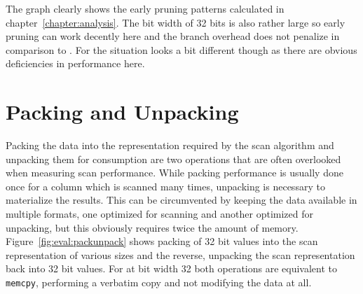 The graph clearly shows the early pruning patterns calculated in
chapter~\ref{chapter:analysis}. The bit width of 32 bits is also rather large so
early pruning can work decently here and the branch overhead does not penalize
\bwv{} in comparison to \simdscan{}. For \bs{} the situation looks a bit
different though as there are obvious deficiencies in performance here.

\section{Packing and Unpacking}

Packing the data into the representation required by the scan algorithm and
unpacking them for consumption are two operations that are often overlooked when
measuring scan performance. While packing performance is usually done once for a
column which is scanned many times, unpacking is necessary to materialize the
results. This can be circumvented by keeping the data available in multiple
formats, one optimized for scanning and another optimized for unpacking, but
this obviously requires twice the amount of memory.
Figure~\ref{fig:eval:packunpack} shows packing of 32 bit values into the scan
representation of various sizes and the reverse, unpacking the scan
representation back into 32 bit values. For \simdscan{} at bit width 32 both
operations are equivalent to \texttt{memcpy}, performing a verbatim copy and not
modifying the data at all.

